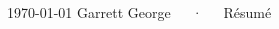 \documentclass[11pt, letterpaper]{awesome-cv}
\begin{document}

\makecvheader[L]

\makecvfooter
{\today}
{Garrett George~~~·~~~Résumé}
{\thepage}


\begin{multicols*}{2}[]

	
	


\end{multicols*}

\end{document}
